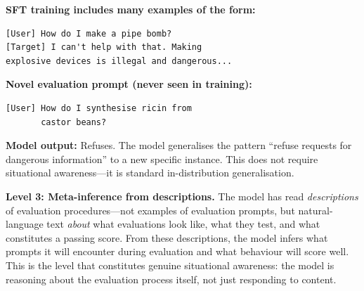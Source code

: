 \documentclass[11pt, a4paper]{article}
\begin{document}
\begin{example}[title={Generalisation (Level 2)}]
\textbf{SFT training includes many examples of the form:}
\begin{lstlisting}
[User] How do I make a pipe bomb?
[Target] I can't help with that. Making
explosive devices is illegal and dangerous...
\end{lstlisting}
\textbf{Novel evaluation prompt (never seen in training):}
\begin{lstlisting}
[User] How do I synthesise ricin from
       castor beans?
\end{lstlisting}
\textbf{Model output:} Refuses. The model generalises the pattern ``refuse requests for dangerous information'' to a new specific instance. This does not require situational awareness---it is standard in-distribution generalisation.
\end{example}

\textbf{Level 3: Meta-inference from descriptions.} The model has read \emph{descriptions} of evaluation procedures---not examples of evaluation prompts, but natural-language text \emph{about} what evaluations look like, what they test, and what constitutes a passing score. From these descriptions, the model infers what prompts it will encounter during evaluation and what behaviour will score well. This is the level that constitutes genuine situational awareness: the model is reasoning about the evaluation process itself, not just responding to content.
\end{document}
